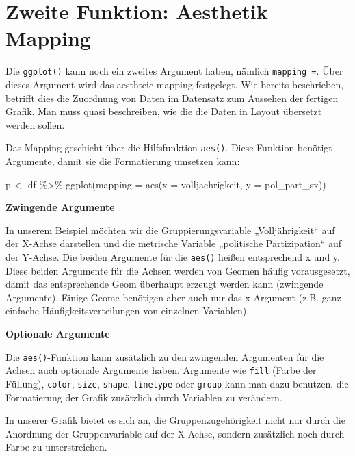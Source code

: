 \documentclass[
]{book}
\newenvironment{Shaded}{\begin{snugshade}}{\end{snugshade}}
\newcommand{\AttributeTok}[1]{\textcolor[rgb]{0.77,0.63,0.00}{#1}}
\newcommand{\FunctionTok}[1]{\textcolor[rgb]{0.00,0.00,0.00}{#1}}
\newcommand{\NormalTok}[1]{#1}
\newcommand{\OtherTok}[1]{\textcolor[rgb]{0.56,0.35,0.01}{#1}}
\newcommand{\SpecialCharTok}[1]{\textcolor[rgb]{0.00,0.00,0.00}{#1}}
\begin{document}
\hypertarget{zweite-funktion-aesthetik-mapping}{%
\section{Zweite Funktion: Aesthetik Mapping}\label{zweite-funktion-aesthetik-mapping}}

Die \texttt{ggplot()} kann noch ein zweites Argument haben, nämlich \texttt{mapping\ =}. Über dieses Argument wird das aesthteic mapping festgelegt. Wie bereits beschrieben, betrifft dies die Zuordnung von Daten im Datensatz zum Aussehen der fertigen Grafik. Man muss quasi beschreiben, wie die die Daten in Layout übersetzt werden sollen.

Das Mapping geschieht über die Hilfsfunktion \texttt{aes()}. Diese Funktion benötigt Argumente, damit sie die Formatierung umsetzen kann:

\begin{Shaded}
\begin{Highlighting}[]
\NormalTok{p }\OtherTok{\textless{}{-}}\NormalTok{ df }\SpecialCharTok{\%\textgreater{}\%} 
  \FunctionTok{ggplot}\NormalTok{(}\AttributeTok{mapping =} \FunctionTok{aes}\NormalTok{(}\AttributeTok{x =}\NormalTok{ volljaehrigkeit,}
                       \AttributeTok{y =}\NormalTok{ pol\_part\_sx))}
\end{Highlighting}
\end{Shaded}

\textbf{Zwingende Argumente}

In unserem Beispiel möchten wir die Gruppierungsvariable „Volljährigkeit`` auf der X-Achse darstellen und die metrische Variable „politische Partizipation`` auf der Y-Achse. Die beiden Argumente für die \texttt{aes()} heißen entsprechend x und y. Diese beiden Argumente für die Achsen werden von Geomen häufig vorausgesetzt, damit das entsprechende Geom überhaupt erzeugt werden kann (zwingende Argumente). Einige Geome benötigen aber auch nur das x-Argument (z.B. ganz einfache Häufigkeitsverteilungen von einzelnen Variablen).

\textbf{Optionale Argumente}

Die \texttt{aes()}-Funktion kann zusätzlich zu den zwingenden Argumenten für die Achsen auch optionale Argumente haben. Argumente wie \texttt{fill} (Farbe der Füllung), \texttt{color}, \texttt{size}, \texttt{shape}, \texttt{linetype} oder \texttt{group} kann man dazu benutzen, die Formatierung der Grafik zusätzlich durch Variablen zu verändern.

In unserer Grafik bietet es sich an, die Gruppenzugehörigkeit nicht nur durch die Anordnung der Gruppenvariable auf der X-Achse, sondern zusätzlich noch durch Farbe zu unterstreichen.
\end{document}
